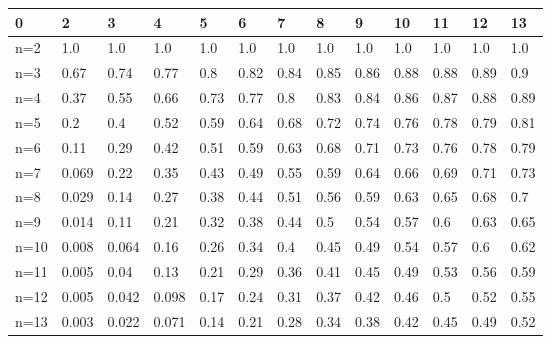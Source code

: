 \begin{tabular}{l|llllllllllll}
\toprule 
0 & 2 & 3 & 4 & 5 & 6 & 7 & 8 & 9 & 10 & 11 & 12 & 13 \\
\hline 
n=2 & 1.0 & 1.0 & 1.0 & 1.0 & 1.0 & 1.0 & 1.0 & 1.0 & 1.0 & 1.0 & 1.0 & 1.0 \\
n=3 & 0.67 & 0.74 & 0.77 & 0.8 & 0.82 & 0.84 & 0.85 & 0.86 & 0.88 & 0.88 & 0.89 & 0.9 \\
n=4 & 0.37 & 0.55 & 0.66 & 0.73 & 0.77 & 0.8 & 0.83 & 0.84 & 0.86 & 0.87 & 0.88 & 0.89 \\
n=5 & 0.2 & 0.4 & 0.52 & 0.59 & 0.64 & 0.68 & 0.72 & 0.74 & 0.76 & 0.78 & 0.79 & 0.81 \\
n=6 & 0.11 & 0.29 & 0.42 & 0.51 & 0.59 & 0.63 & 0.68 & 0.71 & 0.73 & 0.76 & 0.78 & 0.79 \\
n=7 & 0.069 & 0.22 & 0.35 & 0.43 & 0.49 & 0.55 & 0.59 & 0.64 & 0.66 & 0.69 & 0.71 & 0.73 \\
n=8 & 0.029 & 0.14 & 0.27 & 0.38 & 0.44 & 0.51 & 0.56 & 0.59 & 0.63 & 0.65 & 0.68 & 0.7 \\
n=9 & 0.014 & 0.11 & 0.21 & 0.32 & 0.38 & 0.44 & 0.5 & 0.54 & 0.57 & 0.6 & 0.63 & 0.65 \\
n=10 & 0.008 & 0.064 & 0.16 & 0.26 & 0.34 & 0.4 & 0.45 & 0.49 & 0.54 & 0.57 & 0.6 & 0.62 \\
n=11 & 0.005 & 0.04 & 0.13 & 0.21 & 0.29 & 0.36 & 0.41 & 0.45 & 0.49 & 0.53 & 0.56 & 0.59 \\
n=12 & 0.005 & 0.042 & 0.098 & 0.17 & 0.24 & 0.31 & 0.37 & 0.42 & 0.46 & 0.5 & 0.52 & 0.55 \\
n=13 & 0.003 & 0.022 & 0.071 & 0.14 & 0.21 & 0.28 & 0.34 & 0.38 & 0.42 & 0.45 & 0.49 & 0.52 \\
\bottomrule 
\end{tabular}
